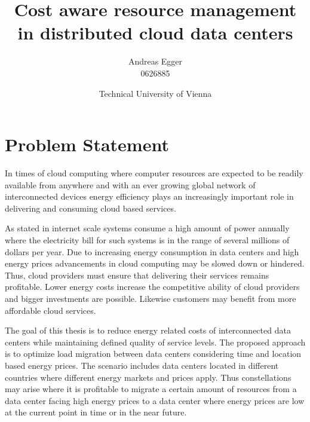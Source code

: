 \documentclass[a4paper]{article}
\title{Cost aware resource management in distributed cloud data centers}
\author{Andreas Egger \\0626885}
\date{Technical University of Vienna}
\begin{document}
\maketitle


\section{Problem Statement}

In times of cloud computing where computer resources are expected to be readily available from anywhere \cite{buyya2009cloud} and with an ever growing global network of interconnected devices energy efficiency plays an increasingly important role in delivering and consuming cloud based services. 

As stated in \cite{qureshi2009cutting} internet scale systems consume a high amount of power annually where the electricity bill for such systems is in the range of several millions of dollars per year. Due to increasing energy consumption in data centers and high energy prices advancements in cloud computing may be slowed down or hindered. Thus, cloud providers must ensure that delivering their services remains profitable. Lower energy costs increase the competitive ability of cloud providers and bigger investments are possible. Likewise customers may benefit from more affordable cloud services. 


The goal of this thesis is to reduce energy related costs of interconnected data centers while maintaining defined quality of service levels. The proposed approach is to optimize load migration between data centers considering time and location based energy prices. The scenario includes data centers located in different countries where different energy markets and prices apply. Thus constellations may arise where it is profitable to migrate a certain amount of resources from a data center facing high energy prices to a data center where energy prices are low at the current point in time or in the near future. 
\end{document}
